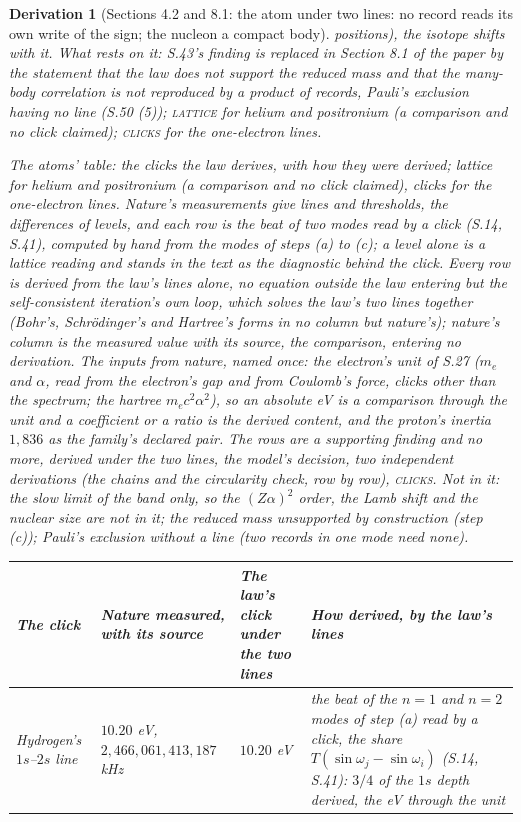 \documentclass[pdflatex,sn-mathphys-num]{sn-jnl}
\newcommand{\fence}[1]{\textup{\textsc{#1}}}
\theoremstyle{thmstyleone}
\newtheorem{derivation}{Derivation}
\begin{document}
\begin{derivation}[Sections 4.2 and 8.1: the atom under two lines: no record reads its own write of the sign; the nucleon a compact body]
positions), the isotope shifts with it. \emph{What rests on it:} S.43's finding is replaced in Section 8.1 of the paper by the statement that the law does not support the reduced mass and that the many-body correlation is not reproduced by a product of records, Pauli's exclusion having no line (S.50 (5)); \fence{lattice} for helium and positronium (a comparison and no click claimed); \fence{clicks} for the one-electron lines.


\noindent\emph{The atoms' table: the clicks the law derives, with how they were derived; lattice for helium and positronium (a comparison and no click claimed), clicks for the one-electron lines.} Nature's measurements give lines and thresholds, the differences of levels, and each row is the beat of two modes read by a click (S.14, S.41), computed by hand from the modes of steps (a) to (c); a level alone is a lattice reading and stands in the text as the diagnostic behind the click. Every row is derived from the law's lines alone, no equation outside the law entering but the self-consistent iteration's own loop, which solves the law's two lines together (Bohr's, Schr\"odinger's and Hartree's forms in no column but nature's); nature's column is the measured value with its source, the comparison, entering no derivation. The inputs from nature, named once: the electron's unit of S.27 ($m_e$ and $\alpha$, read from the electron's gap and from Coulomb's force, clicks other than the spectrum; the hartree $m_e c^2\alpha^2$), so an absolute eV is a comparison through the unit and a coefficient or a ratio is the derived content, and the proton's inertia $1{,}836$ as the family's declared pair. The rows are a supporting finding and no more, derived under the two lines, the model's decision, two independent derivations (the chains and the circularity check, row by row), \fence{clicks}. Not in it: the slow limit of the band only, so the $(Z\alpha)^2$ order, the Lamb shift and the nuclear size are not in it; the reduced mass unsupported by construction (step (c)); Pauli's exclusion without a line (two records in one mode need none).
\begin{center}\small\begin{tabular}{p{2.0cm}p{2.4cm}p{1.8cm}p{5.1cm}}
\hline
The click & Nature measured, with its source & The law's click under the two lines & How derived, by the law's lines\\
\hline
Hydrogen's $1s$--$2s$ line & $10.20$ eV, $2{,}466{,}061{,}413{,}187$ kHz \cite{parthey} & $10.20$ eV & the beat of the $n = 1$ and $n = 2$ modes of step (a) read by a click, the share $T(\sin\omega_j - \sin\omega_i)$ (S.14, S.41): $3 / 4$ of the $1s$ depth derived, the eV through the unit\\

\end{tabular}
\end{center}
\end{derivation}
\end{document}
